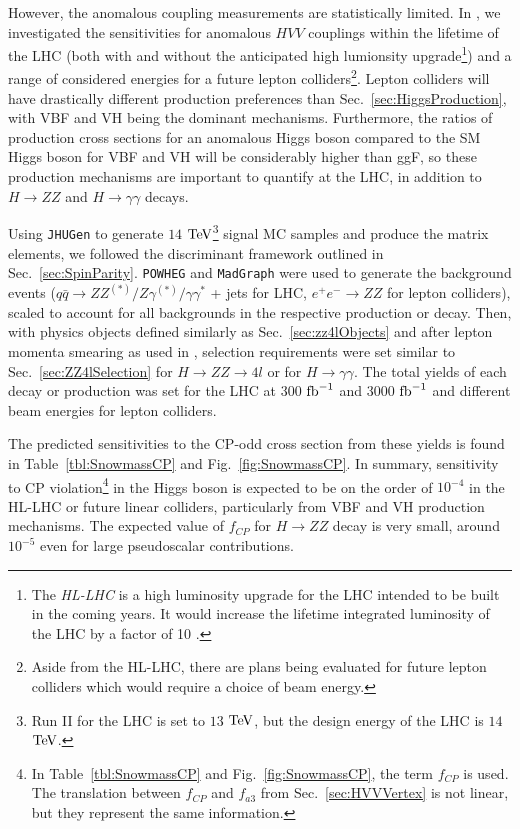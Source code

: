 However, the anomalous coupling measurements are statistically limited. In \cite{Anderson:2013afp}, we investigated the sensitivities for anomalous $HVV$ couplings within the lifetime of the LHC (both with and without the anticipated high lumionsity upgrade\footnote{The \textit{HL-LHC} is a high luminosity upgrade for the LHC intended to be built in the coming years. It would increase the lifetime integrated luminosity of the LHC by a factor of 10 \cite{ATLAS:2013hta,CMS:2013xfa,Dawson:2013bba}.}) and a range of considered energies for a future lepton colliders\footnote{Aside from the HL-LHC, there are plans being evaluated for future lepton colliders \cite{Behnke:2013xla,Koratzinos:2013ncw} which would require a choice of beam energy.}. Lepton colliders will have drastically different production preferences than Sec.~\ref{sec:HiggsProduction}, with VBF and VH being the dominant mechanisms. Furthermore, the ratios of production cross sections for an anomalous Higgs boson compared to the SM Higgs boson for VBF and VH will be considerably higher than ggF, so these production mechanisms are important to quantify at the LHC, in addition to $H\rightarrow ZZ$ and $H\rightarrow \gamma\gamma$ decays.

Using {\tt JHUGen} to generate $14$ $\rm{TeV}$\footnote{Run II for the LHC is set to $13$ $\rm{TeV}$, but the design energy of the LHC is $14$ $\rm{TeV}$.} signal MC samples and produce the matrix elements, we followed the discriminant framework outlined in Sec.~\ref{sec:SpinParity}. {\tt POWHEG} and {\tt MadGraph} were used to generate the background events ($q\bar{q}\rightarrow ZZ^{(*)}/Z\gamma^{(*)}/\gamma\gamma^{*}$ + jets for LHC, $e^+e^-\rightarrow ZZ$ for lepton colliders), scaled to account for all backgrounds in the respective production or decay. Then, with physics objects defined similarly as Sec.~\ref{sec:zz4lObjects} and after lepton momenta smearing as used in \cite{Gao:2010qx,Bolognesi:2012mm}, selection requirements were set similar to Sec.~\ref{sec:ZZ4lSelection} for $H\rightarrow ZZ\rightarrow 4l$ or \cite{Khachatryan:2014ira} for $H\rightarrow \gamma\gamma$. The total yields of each decay or production was set for the LHC at $300$ $\rm{fb}^{-1}$ and $3000$ $\rm{fb}^{-1}$ and different beam energies for lepton colliders.

The predicted sensitivities to the CP-odd cross section from these yields is found in Table~\ref{tbl:SnowmassCP} and Fig.~\ref{fig:SnowmassCP}. In summary, sensitivity to CP violation\footnote{In Table~\ref{tbl:SnowmassCP} and Fig.~\ref{fig:SnowmassCP}, the term $f_{CP}$ is used. The translation between $f_{CP}$ and $f_{a3}$ from Sec.~\ref{sec:HVVVertex} is not linear, but they represent the same information.} in the Higgs boson is expected to be on the order of $10^{-4}$ in the HL-LHC or future linear colliders, particularly from VBF and VH production mechanisms. The expected value of $f_{CP}$ for $H\rightarrow ZZ$ decay is very small, around $10^{-5}$ even for large pseudoscalar contributions.

